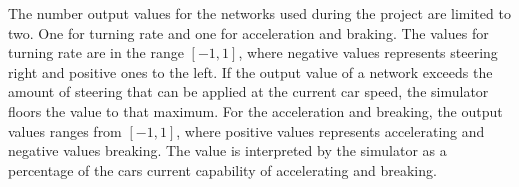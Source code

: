 \noindent
The number output values for the networks used during the project are limited to two. One for turning rate and one for acceleration and braking. The values for turning rate are in the range $[-1,1]$, where negative values represents steering right and positive ones to the left. If the output value of a network exceeds the amount of steering that can be applied at the current car speed, the simulator floors the value to that maximum. For the acceleration and breaking, the output values ranges from $[-1, 1]$, where positive values represents accelerating and negative values breaking. The value is interpreted by the simulator as a percentage of the cars current capability of accelerating and breaking.








